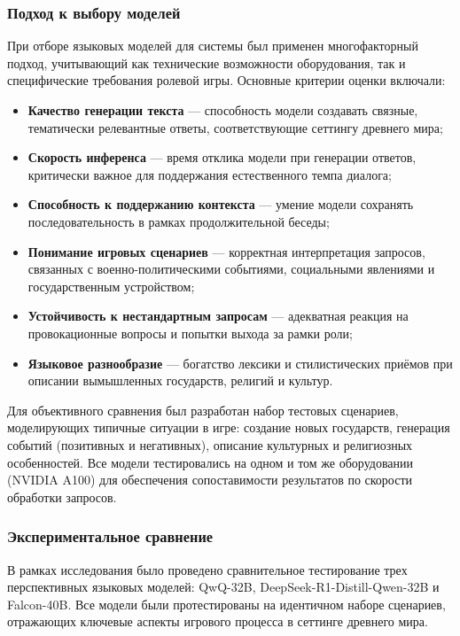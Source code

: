 \subsubsection{Подход к выбору моделей}

При отборе языковых моделей для системы был применен многофакторный подход, учитывающий как технические возможности оборудования, так и специфические требования ролевой игры. Основные критерии оценки включали:

\begin{itemize}
\item \textbf{Качество генерации текста} — способность модели создавать связные, тематически релевантные ответы, соответствующие сеттингу древнего мира;
\item \textbf{Скорость инференса} — время отклика модели при генерации ответов, критически важное для поддержания естественного темпа диалога;
\item \textbf{Способность к поддержанию контекста} — умение модели сохранять последовательность в рамках продолжительной беседы;
\item \textbf{Понимание игровых сценариев} — корректная интерпретация запросов, связанных с военно-политическими событиями, социальными явлениями и государственным устройством;
\item \textbf{Устойчивость к нестандартным запросам} — адекватная реакция на провокационные вопросы и попытки выхода за рамки роли;
\item \textbf{Языковое разнообразие} — богатство лексики и стилистических приёмов при описании вымышленных государств, религий и культур.
\end{itemize}

Для объективного сравнения был разработан набор тестовых сценариев, моделирующих типичные ситуации в игре: создание новых государств, генерация событий (позитивных и негативных), описание культурных и религиозных особенностей. Все модели тестировались на одном и том же оборудовании (NVIDIA A100) для обеспечения сопоставимости результатов по скорости обработки запросов.
\subsubsection{Экспериментальное сравнение}

В рамках исследования было проведено сравнительное тестирование трех перспективных языковых моделей: QwQ-32B, DeepSeek-R1-Distill-Qwen-32B и Falcon-40B. Все модели были протестированы на идентичном наборе сценариев, отражающих ключевые аспекты игрового процесса в сеттинге древнего мира.

